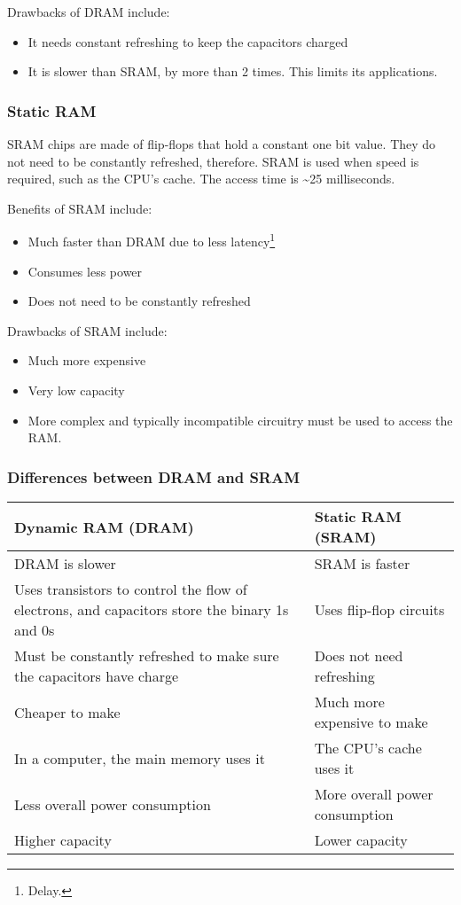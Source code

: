 \documentclass[../main.tex]{subfiles}
\begin{document}
Drawbacks of DRAM include:

\begin{itemize}
    \item It needs constant refreshing to keep the capacitors charged
    \item It is slower than SRAM, by more than 2 times. This limits its applications.
\end{itemize}

\subsubsection{Static RAM}

SRAM chips are made of flip-flops that hold a constant one bit value. They do not need to be constantly refreshed, therefore. SRAM is used when speed is required, such as the CPU's cache. The access time is \textasciitilde25 milliseconds.

Benefits of SRAM include:

\begin{itemize}
    \item Much faster than DRAM due to less latency\footnote{Delay.}
    \item Consumes less power
    \item Does not need to be constantly refreshed
\end{itemize}

Drawbacks of SRAM include:

\begin{itemize}
    \item Much more expensive
    \item Very low capacity
    \item More complex and typically incompatible circuitry must be used to access the RAM.
\end{itemize}

\subsubsection{Differences between DRAM and SRAM}

\begin{longtable}{|p{}|p{}|}
    \hline 
    \textbf{Dynamic RAM (DRAM)} & \textbf{Static RAM (SRAM)}
    \\ \hline
    DRAM is slower & SRAM is faster
    \\ \hline
    Uses transistors to control the flow of electrons, and capacitors store the binary 1s and 0s & Uses flip-flop circuits
    \\ \hline
    Must be constantly refreshed to make sure the capacitors have charge & Does not need refreshing
    \\ \hline
    Cheaper to make & Much more expensive to make
    \\ \hline
    In a computer, the main memory uses it & The CPU's cache uses it
    \\ \hline
    Less overall power consumption & More overall power consumption
    \\ \hline
    Higher capacity & Lower capacity
    \\ \hline
\end{longtable}
\end{document}
